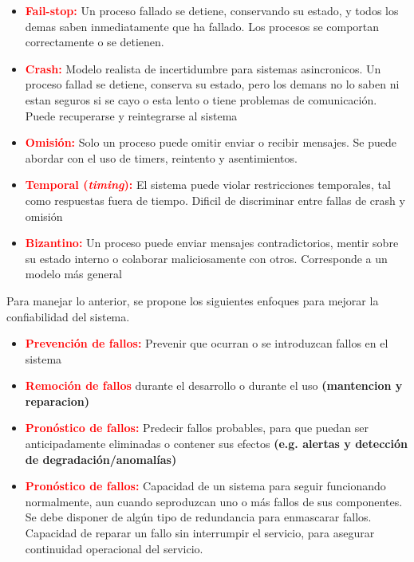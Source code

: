 \begin{itemize}
    \item \textcolor{red}{\textbf{Fail-stop:}} Un proceso fallado se detiene, conservando su estado, y todos los demas saben inmediatamente que ha fallado. Los procesos se comportan correctamente o se detienen.
    \item \textcolor{red}{\textbf{Crash:}} Modelo realista de incertidumbre para sistemas asincronicos. Un proceso fallad se detiene, conserva su estado, pero los demans no lo saben ni estan seguros si se cayo o esta lento o tiene problemas de comunicación. Puede recuperarse y reintegrarse al sistema
    \item \textcolor{red}{\textbf{Omisión:}} Solo un proceso puede omitir enviar o recibir mensajes. Se puede abordar con el uso de timers, reintento y asentimientos.
    \item \textcolor{red}{\textbf{Temporal (\textit{timing}):}} El sistema puede violar restricciones temporales, tal como respuestas fuera de tiempo. Dificil de discriminar entre fallas de crash y omisión
    \item \textcolor{red}{\textbf{Bizantino:}} Un proceso puede enviar mensajes contradictorios, mentir sobre su estado interno o colaborar maliciosamente con otros. Corresponde a un modelo más general
\end{itemize}

Para manejar lo anterior, se propone los siguientes enfoques para mejorar la confiabilidad del sistema.

\begin{itemize}
    \item \textcolor{red}{\textbf{Prevención de fallos:}} Prevenir que ocurran o se introduzcan fallos en el sistema
    \item \textcolor{red}{\textbf{Remoción de fallos}} durante el desarrollo o durante el uso \textbf{(mantencion y reparacion)}
    \item \textcolor{red}{\textbf{Pronóstico de fallos:}} Predecir fallos probables, para que puedan ser anticipadamente eliminadas o contener sus efectos \textbf{(e.g. alertas y detección de degradación/anomalías)}
    \item \textcolor{red}{\textbf{Pronóstico de fallos:}} Capacidad de un sistema para seguir funcionando normalmente, aun cuando seproduzcan uno o más fallos de sus componentes.
    \subitem Se debe disponer de algún tipo de redundancia para enmascarar fallos.
    \subitem Capacidad de reparar un fallo sin interrumpir el servicio, para asegurar continuidad operacional del servicio.
\end{itemize}

